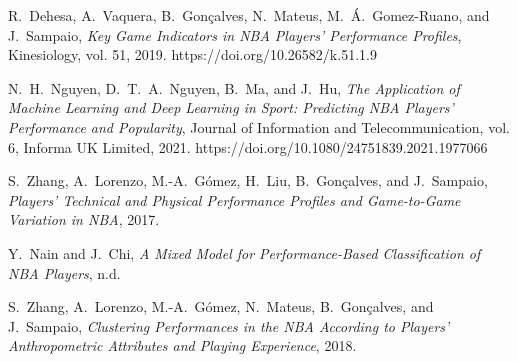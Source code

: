 \documentclass[fleqn,10pt]{SelfArx} %
\begin{document}
\begin{thebibliography}{99}

R.~Dehesa, A.~Vaquera, B.~Gonçalves, N.~Mateus, M.~Á.~Gomez-Ruano, and J.~Sampaio,
\textit{Key Game Indicators in NBA Players’ Performance Profiles},
Kinesiology, vol. 51, 2019. https://doi.org/10.26582/k.51.1.9

N.~H.~Nguyen, D.~T.~A.~Nguyen, B.~Ma, and J.~Hu,
\textit{The Application of Machine Learning and Deep Learning in Sport: Predicting NBA Players’ Performance and Popularity},
Journal of Information and Telecommunication, vol. 6, Informa UK Limited, 2021. https://doi.org/10.1080/24751839.2021.1977066

S.~Zhang, A.~Lorenzo, M.-A.~Gómez, H.~Liu, B.~Gonçalves, and J.~Sampaio,
\textit{Players’ Technical and Physical Performance Profiles and Game-to-Game Variation in NBA}, 2017.

Y.~Nain and J.~Chi,
\textit{A Mixed Model for Performance-Based Classification of NBA Players}, n.d.

S.~Zhang, A.~Lorenzo, M.-A.~Gómez, N.~Mateus, B.~Gonçalves, and J.~Sampaio,
\textit{Clustering Performances in the NBA According to Players’ Anthropometric Attributes and Playing Experience}, 2018.

\end{thebibliography}
\end{document}
